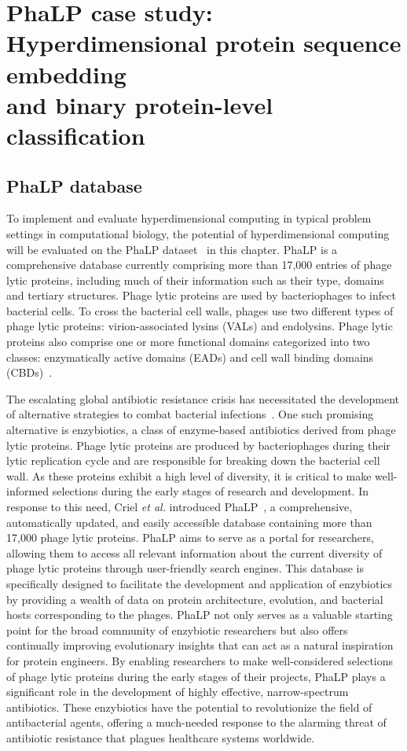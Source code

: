 \chapter[PhaLP case study: Hyperdimensional protein sequence embedding and binary protein-level classification]{PhaLP case study:\\Hyperdimensional protein sequence embedding\\and binary protein-level classification}
\section{PhaLP database}
To implement and evaluate hyperdimensional computing in typical problem settings in computational biology, the potential of hyperdimensional computing will be evaluated on the PhaLP dataset~\cite{phalp} in this chapter. PhaLP is a comprehensive database currently comprising more than 17,000 entries of phage lytic proteins, including much of their information such as their type, domains and tertiary structures. Phage lytic proteins are used by bacteriophages to infect bacterial cells. To cross the bacterial cell walls, phages use two different types of phage lytic proteins: virion-associated lysins (VALs) and endolysins. Phage lytic proteins also comprise one or more functional domains categorized into two classes: enzymatically active domains (EADs) and cell wall binding domains (CBDs)~\cite{phage}.

The escalating global antibiotic resistance crisis has necessitated the development of alternative strategies to combat bacterial infections~\cite{antibiotic}. One such promising alternative is enzybiotics, a class of enzyme-based antibiotics derived from phage lytic proteins. Phage lytic proteins are produced by bacteriophages during their lytic replication cycle and are responsible for breaking down the bacterial cell wall. As these proteins exhibit a high level of diversity, it is critical to make well-informed selections during the early stages of research and development. In response to this need, Criel \textit{ et al.} introduced PhaLP~\cite{phalp}, a comprehensive, automatically updated, and easily accessible database containing more than 17,000 phage lytic proteins. PhaLP aims to serve as a portal for researchers, allowing them to access all relevant information about the current diversity of phage lytic proteins through user-friendly search engines. This database is specifically designed to facilitate the development and application of enzybiotics by providing a wealth of data on protein architecture, evolution, and bacterial hosts corresponding to the phages. PhaLP not only serves as a valuable starting point for the broad community of enzybiotic researchers but also offers continually improving evolutionary insights that can act as a natural inspiration for protein engineers. By enabling researchers to make well-considered selections of phage lytic proteins during the early stages of their projects, PhaLP plays a significant role in the development of highly effective, narrow-spectrum antibiotics. These enzybiotics have the potential to revolutionize the field of antibacterial agents, offering a much-needed response to the alarming threat of antibiotic resistance that plagues healthcare systems worldwide.

